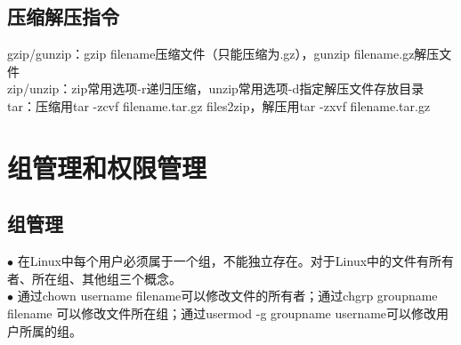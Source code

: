 \documentclass[11pt]{article}
\begin{document}
\subsection{压缩解压指令}
gzip/gunzip：gzip filename压缩文件（只能压缩为.gz），gunzip filename.gz解压文件  \\
zip/unzip：zip常用选项-r递归压缩，unzip常用选项-d指定解压文件存放目录  \\
tar：压缩用tar -zcvf filename.tar.gz files2zip，解压用tar -zxvf filename.tar.gz

\section{组管理和权限管理}

\subsection{组管理}
$\bullet$ 在Linux中每个用户必须属于一个组，不能独立存在。对于Linux中的文件有所有者、所在组、其他组三个概念。  \\
$\bullet$ 通过chown username filename可以修改文件的所有者；通过chgrp groupname filename
可以修改文件所在组；通过usermod -g groupname username可以修改用户所属的组。
\end{document}
